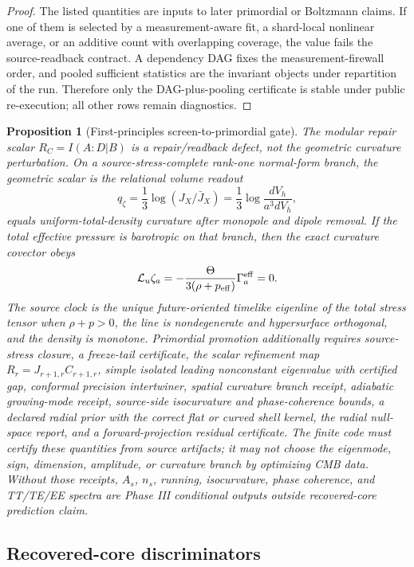 \documentclass[11pt]{article}
\newtheorem{proposition}[theorem]{Proposition}
\begin{document}
\begin{proof}
The listed quantities are inputs to later primordial or Boltzmann claims.  If
one of them is selected by a measurement-aware fit, a shard-local nonlinear
average, or an additive count with overlapping coverage, the value fails the
source-readback contract.  A dependency DAG fixes the
measurement-firewall order, and pooled sufficient statistics are the invariant
objects under repartition of the run.  Therefore only the DAG-plus-pooling
certificate is stable under public re-execution; all other rows remain
diagnostics.
\end{proof}

\begin{proposition}[First-principles screen-to-primordial gate]\label{prop:compact-source-only-primordial-gate}
The modular repair scalar \(R_C=I(A:D|B)\) is a repair/readback defect, not the
geometric curvature perturbation.  On a source-stress-complete rank-one
normal-form branch, the geometric scalar is the relational volume readout
\[
q_\zeta=\frac13\log(J_X/\bar J_X)
=\frac13\log\frac{dV_h}{a^3dV_{\bar h}},
\]
equals uniform-total-density curvature after monopole and dipole removal.  If
the total effective pressure is barotropic on that branch, then the exact
curvature covector obeys
\[
\mathcal L_u\zeta_a
=
-\frac{\Theta}{3(\rho+p_{\rm eff})}\Gamma_a^{\rm eff}
=0 .
\]
The source clock is the unique future-oriented timelike eigenline of the total
stress tensor when \(\rho+p>0\), the line is nondegenerate and hypersurface
orthogonal, and the density is monotone.  Primordial promotion additionally
requires source-stress closure, a freeze-tail certificate, the scalar
refinement map \(R_r=J_{r+1,r}C_{r+1,r}\), simple isolated leading nonconstant
eigenvalue with certified gap, conformal precision intertwiner, spatial
curvature branch receipt, adiabatic growing-mode receipt, source-side
isocurvature and phase-coherence bounds, a declared radial prior with the
correct flat or curved shell kernel, the radial null-space report, and a
forward-projection residual certificate.  The finite code must certify these
quantities from source artifacts; it may not choose the eigenmode, sign,
dimension, amplitude, or curvature branch by optimizing CMB data.  Without those
receipts, \(A_s\), \(n_s\), running, isocurvature, phase coherence, and
TT/TE/EE spectra are Phase III conditional outputs outside recovered-core
prediction claim.
\end{proposition}

\subsection{Recovered-core discriminators}
\end{document}
